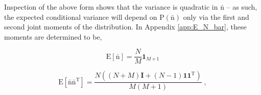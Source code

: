 \documentclass[12pt]{article}
\begin{document}
%
%
%
%
%

Inspection of the above form shows that the variance is quadratic in $\bar{\bm{\mathrm{n}}}$ -- as such, the expected conditional variance will depend on $\text{P}(\bar{\bm{\mathrm{n}}})$ only via the first and second joint moments of the distribution. In Appendix \ref{app:E_N_bar}, these moments are determined to be,

\begin{equation}
\text{E}[\bar{\bm{\mathrm{n}}}] = \frac{N}{M} \bm{1}_{M \times 1}
\end{equation}

\begin{equation}
\text{E}[\bar{\bm{\mathrm{n}}} \bar{\bm{\mathrm{n}}}^\text{T}] = \frac{N \left( (N+M)\textbf{I} + (N-1)\bm{1}\bm{1}^\text{T} \right)}{M(M+1)} \;,
\end{equation}
\end{document}
